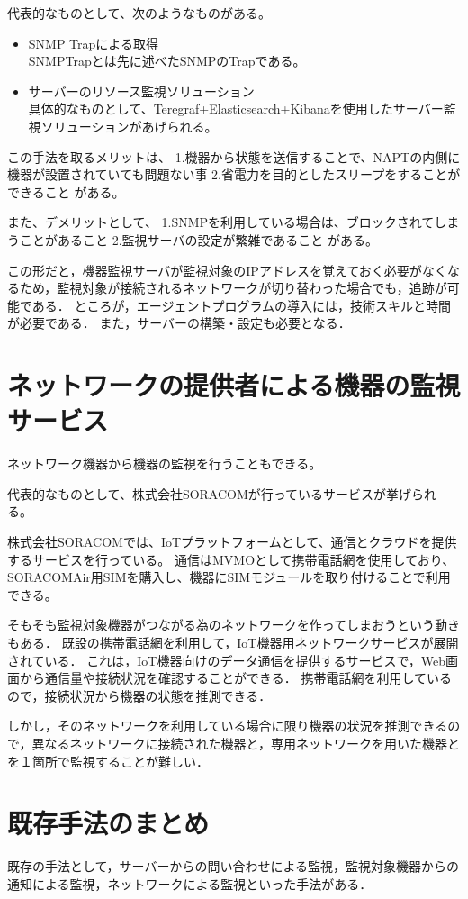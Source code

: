 	代表的なものとして、次のようなものがある。
	\begin{itemize}
		\item SNMP Trapによる取得\\
			SNMPTrapとは先に述べたSNMPのTrapである。
		\item サーバーのリソース監視ソリューション\\
			具体的なものとして、Teregraf+Elasticsearch+Kibanaを使用したサーバー監視ソリューションがあげられる。
	\end{itemize}
	
	この手法を取るメリットは、
	1.機器から状態を送信することで、NAPTの内側に機器が設置されていても問題ない事
	2.省電力を目的としたスリープをすることができること
	がある。

	また、デメリットとして、
	1.SNMPを利用している場合は、ブロックされてしまうことがあること
	2.監視サーバの設定が繁雑であること
	がある。

	この形だと，機器監視サーバが監視対象のIPアドレスを覚えておく必要がなくなるため，監視対象が接続されるネットワークが切り替わった場合でも，追跡が可能である．
	ところが，エージェントプログラムの導入には，技術スキルと時間が必要である．
	また，サーバーの構築・設定も必要となる．

\section{ネットワークの提供者による機器の監視サービス} %
	ネットワーク機器から機器の監視を行うこともできる。

	代表的なものとして、株式会社SORACOMが行っているサービスが挙げられる。

	株式会社SORACOMでは、IoTプラットフォームとして、通信とクラウドを提供するサービスを行っている。
	通信はMVMOとして携帯電話網を使用しており、SORACOMAir用SIMを購入し、機器にSIMモジュールを取り付けることで利用できる。

	

	そもそも監視対象機器がつながる為のネットワークを作ってしまおうという動きもある．
	既設の携帯電話網を利用して，IoT機器用ネットワークサービスが展開されている．
	これは，IoT機器向けのデータ通信を提供するサービスで，Web画面から通信量や接続状況を確認することができる．
	携帯電話網を利用しているので，接続状況から機器の状態を推測できる．

	しかし，そのネットワークを利用している場合に限り機器の状況を推測できるので，異なるネットワークに接続された機器と，専用ネットワークを用いた機器とを１箇所で監視することが難しい．

\section{既存手法のまとめ}
	既存の手法として，サーバーからの問い合わせによる監視，監視対象機器からの通知による監視，ネットワークによる監視といった手法がある．








